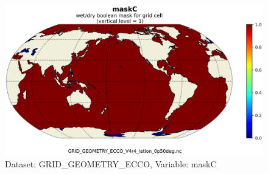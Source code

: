 \begin{figure}[H]
\centering
\includegraphics[scale=0.55]{../images/plots/latlon_plots_coords/Geometry_Parameters_for_the_0.5_degree_Lat-Lon_Model_Grid_(Version_4_Release_4)/maskC.png}
\caption{Dataset: GRID\_GEOMETRY\_ECCO, Variable: maskC}
\label{tab:table-GRID_GEOMETRY_ECCO_maskC-Plot}
\end{figure}
\newpage